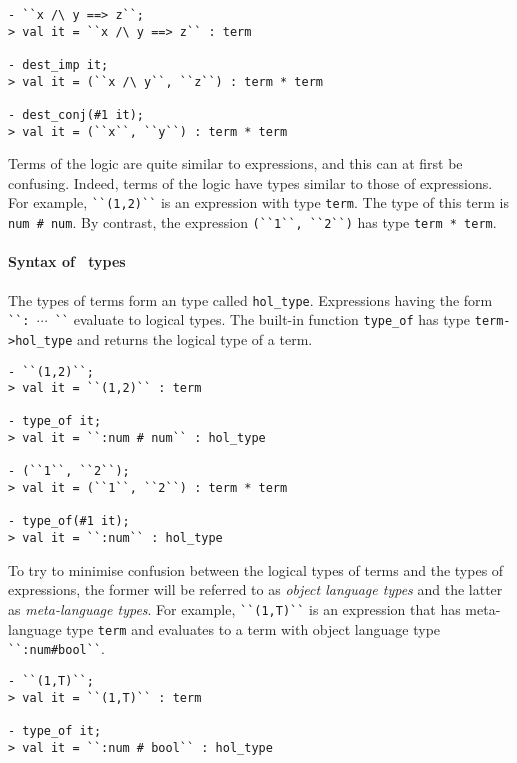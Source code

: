 \setcounter{sessioncount}{0}
\begin{session}
\begin{verbatim}
- ``x /\ y ==> z``;
> val it = ``x /\ y ==> z`` : term

- dest_imp it;
> val it = (``x /\ y``, ``z``) : term * term

- dest_conj(#1 it);
> val it = (``x``, ``y``) : term * term
\end{verbatim}
\end{session}

Terms of the \HOL{} logic are quite similar to \ML{} expressions, and
this can at first be confusing.
Indeed, terms of the logic have types similar to those of \ML{} expressions.  For example, {\small\verb|``(1,2)``|} is an \ML{} expression with \ML{} type {\small\verb|term|}.
The \HOL{} type of this term is {\small\verb|num # num|}.
By contrast, the \ML{} expression
{\small\verb|(``1``, ``2``)|} has type {\small\verb|term * term|}.

\paragraph{Syntax of \HOL\ types}

The types of \HOL{} terms form an \ML{} type called {\small\verb|hol_type|}.  Expressions having the form {\small\verb|``: |}$\cdots${\small\verb| ``|} evaluate to logical types.
The built-in function {\small\verb|type_of|} has \ML{} type {\small\verb|term->hol_type|} and returns the logical type of a term.

\begin{session}
\begin{verbatim}
- ``(1,2)``;
> val it = ``(1,2)`` : term

- type_of it;
> val it = ``:num # num`` : hol_type

- (``1``, ``2``);
> val it = (``1``, ``2``) : term * term

- type_of(#1 it);
> val it = ``:num`` : hol_type
\end{verbatim}
\end{session}

To try to minimise confusion between the logical types of \HOL{} terms and the \ML{} types of \ML{} expressions, the former will be referred to as \emph{object language types} and the latter as {\it meta-language types\/}.
For example, {\small\verb|``(1,T)``|} is an \ML{} expression that has meta-language type {\small\verb|term|} and evaluates to a term with object language type {\small\verb|``:num#bool``|}.
%
\begin{session}
\begin{verbatim}
- ``(1,T)``;
> val it = ``(1,T)`` : term

- type_of it;
> val it = ``:num # bool`` : hol_type
\end{verbatim}
\end{session}
%
